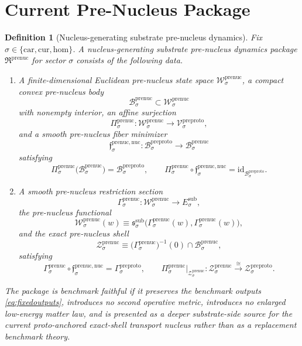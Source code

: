 \documentclass[11pt]{article}
\newcommand{\Car}{\mathrm{car}}
\newcommand{\Cur}{\mathrm{cur}}
\newcommand{\Hom}{\mathrm{hom}}
\newcommand{\SubTarget}[1]{E_{#1}^{\mathrm{sub}}}
\newcommand{\SubPair}[1]{\mathfrak s_{#1}^{\mathrm{sub}}}
\newcommand{\PreProtoSpace}[1]{\mathcal V_{#1}^{\mathrm{preproto}}}
\newcommand{\PreProtoBody}[1]{\mathcal B_{#1}^{\mathrm{preproto}}}
\newcommand{\PreProtoSection}[1]{\Gamma_{#1}^{\mathrm{preproto}}}
\newcommand{\PreProtoShellSet}[1]{\mathcal Z_{#1}^{\mathrm{preproto}}}
\newcommand{\PreNucPackage}{\mathfrak R^{\mathrm{prenuc}}}
\newcommand{\PreNucSpace}[1]{\mathcal W_{#1}^{\mathrm{prenuc}}}
\newcommand{\PreNucBody}[1]{\mathcal B_{#1}^{\mathrm{prenuc}}}
\newcommand{\PreNucProj}[1]{\Pi_{#1}^{\mathrm{prenuc}}}
\newcommand{\PreNucNucleusMin}[1]{\mathfrak f_{#1}^{\mathrm{prenuc,nuc}}}
\newcommand{\PreNucSection}[1]{\Gamma_{#1}^{\mathrm{prenuc}}}
\newcommand{\PreNucFunctional}[1]{\mathscr W_{#1}^{\mathrm{prenuc}}}
\newcommand{\PreNucShellSet}[1]{\mathcal Z_{#1}^{\mathrm{prenuc}}}
\newtheorem{definition}{Definition}
\begin{document}
\section{Current Pre-Nucleus Package}

\begin{definition}[Nucleus-generating substrate pre-nucleus dynamics]
\label{def:prenuc}
Fix \(\sigma\in\{\Car,\Cur,\Hom\}\). A nucleus-generating substrate pre-nucleus dynamics package \(\PreNucPackage\) for sector \(\sigma\) consists of the following data.
\begin{enumerate}
    \item A finite-dimensional Euclidean pre-nucleus state space \(\PreNucSpace{\sigma}\), a compact convex pre-nucleus body
    \[
    \PreNucBody{\sigma}\subset\PreNucSpace{\sigma}
    \]
    with nonempty interior, an affine surjection
    \[
    \PreNucProj{\sigma}:\PreNucSpace{\sigma}\to\PreProtoSpace{\sigma},
    \]
    and a smooth pre-nucleus fiber minimizer
    \[
    \PreNucNucleusMin{\sigma}:\PreProtoBody{\sigma}\to\PreNucBody{\sigma}
    \]
    satisfying
    \[
    \PreNucProj{\sigma}\bigl(\PreNucBody{\sigma}\bigr)=\PreProtoBody{\sigma},
    \qquad
    \PreNucProj{\sigma}\circ\PreNucNucleusMin{\sigma}
    =
    \mathrm{id}_{\PreProtoBody{\sigma}}.
    \]
    \item A smooth pre-nucleus restriction section
    \[
    \PreNucSection{\sigma}:\PreNucSpace{\sigma}\to\SubTarget{\sigma},
    \]
    the pre-nucleus functional
    \[
    \PreNucFunctional{\sigma}(w)
    \equiv
    \SubPair{\sigma}\bigl(\PreNucSection{\sigma}(w),\PreNucSection{\sigma}(w)\bigr),
    \]
    and the exact pre-nucleus shell
    \[
    \PreNucShellSet{\sigma}
    \equiv
    \bigl(\PreNucSection{\sigma}\bigr)^{-1}(0)\cap\PreNucBody{\sigma},
    \]
    satisfying
    \[
    \PreNucSection{\sigma}\circ\PreNucNucleusMin{\sigma}
    =
    \PreProtoSection{\sigma},
    \qquad
    \PreNucProj{\sigma}\big|_{\PreNucShellSet{\sigma}}
    :
    \PreNucShellSet{\sigma}
    \xrightarrow{\cong}
    \PreProtoShellSet{\sigma}.
    \]
\end{enumerate}
The package is \emph{benchmark faithful} if it preserves the benchmark outputs \eqref{eq:fixedoutputs}, introduces no second operative metric, introduces no enlarged low-energy matter law, and is presented as a deeper substrate-side source for the current proto-anchored exact-shell transport nucleus rather than as a replacement benchmark theory.
\end{definition}
\end{document}
